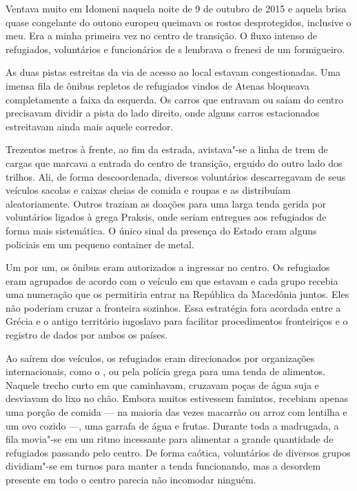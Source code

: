 \putodd{}
\clearpage

 

Ventava muito em Idomeni naquela noite de 9 de outubro de 2015 e aquela
brisa quase congelante do outono europeu queimava os rostos desprotegidos, inclusive o meu.
% 
% 
%
%
Era a minha primeira vez no centro de transição. O fluxo intenso de refugiados, voluntários e funcionários de
s lembrava o frenesi de um formigueiro.

As duas pistas estreitas da via de acesso ao local estavam
congestionadas. Uma imensa fila de ônibus repletos de refugiados vindos
de Atenas bloqueava completamente a faixa da esquerda. Os carros que
entravam ou saíam do centro precisavam dividir a pista do lado direito,
onde alguns carros estacionados estreitavam ainda mais aquele corredor.

Trezentos metros à frente, ao fim da estrada, avistava"-se a linha de
trem de cargas que marcava a entrada do centro de transição, erguido do
outro lado dos trilhos. Ali, de forma descoordenada, diversos
voluntários descarregavam de seus veículos sacolas e caixas cheias de
comida e roupas e as distribuíam aleatoriamente. Outros traziam as
doações para uma larga tenda gerida por voluntários ligados à  grega
Praksis, onde seriam entregues aos refugiados de forma mais sistemática.
O único sinal da presença do Estado eram alguns policiais em um pequeno
container de metal.

Um por um, os ônibus eram autorizados a ingressar no centro. Os
refugiados eram agrupados de acordo com o veículo em que estavam e cada grupo recebia uma numeração que os
permitiria entrar na República da Macedônia juntos. Eles não poderiam
cruzar a fronteira sozinhos. Essa estratégia fora acordada entre a
Grécia e o antigo território iugoslavo para facilitar procedimentos
fronteiriços e o registro de dados por ambos os países.

Ao saírem dos veículos, os refugiados eram direcionados por organizações
internacionais, como o , ou pela polícia grega para uma tenda de
alimentos. Naquele trecho curto em que caminhavam, cruzavam poças
de água suja e desviavam do lixo no chão. Embora muitos estivessem
famintos, recebiam apenas uma porção de comida --- na maioria das
vezes macarrão ou arroz com lentilha e um ovo cozido \mbox{---,} uma garrafa de
água e frutas. Durante toda a madrugada, a fila movia"-se em um ritmo
incessante para alimentar a grande quantidade de refugiados passando
pelo centro. De forma caótica, voluntários de diversos grupos
dividiam"-se em turnos para manter a tenda funcionando, mas a desordem 
presente em todo o centro parecia não incomodar ninguém.


